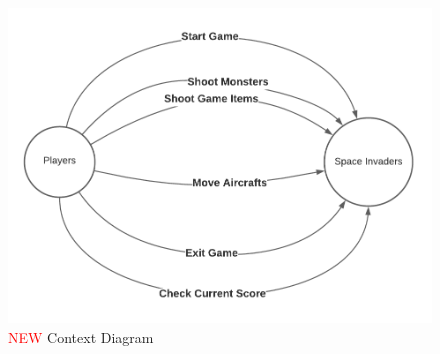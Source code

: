 \documentclass[12pt]{article}
\begin{document}
\newpage
\begin{figure}[h!]
\begin{center}
\includegraphics[scale=1]{New_Context_Diagram.png}
\end{center}
\caption{\textcolor{red}{NEW} Context Diagram}
\end{figure}
\newpage
\end{document}
